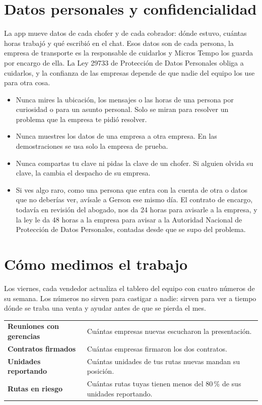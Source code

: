 \documentclass[a4paper]{article}
\begin{document}
\section{Datos personales y confidencialidad}

La app mueve datos de cada chofer y de cada cobrador: dónde estuvo, cuántas horas trabajó y qué escribió en el chat. Esos datos son de cada persona, la empresa de transporte es la responsable de cuidarlos y Micros Tempo los guarda por encargo de ella. La Ley 29733 de Protección de Datos Personales obliga a cuidarlos, y la confianza de las empresas depende de que nadie del equipo los use para otra cosa.

\begin{itemize}
\item Nunca mires la ubicación, los mensajes o las horas de una persona por curiosidad o para un asunto personal. Solo se miran para resolver un problema que la empresa te pidió resolver.
\item Nunca muestres los datos de una empresa a otra empresa. En las demostraciones se usa solo la empresa de prueba.
\item Nunca compartas tu clave ni pidas la clave de un chofer. Si alguien olvida su clave, la cambia el despacho de su empresa.
\item Si ves algo raro, como una persona que entra con la cuenta de otra o datos que no deberías ver, avísale a Gerson ese mismo día. El contrato de encargo, todavía en revisión del abogado, nos da 24 horas para avisarle a la empresa, y la ley le da 48 horas a la empresa para avisar a la Autoridad Nacional de Protección de Datos Personales, contadas desde que se supo del problema.
\end{itemize}

\section{Cómo medimos el trabajo}

Los viernes, cada vendedor actualiza el tablero del equipo con cuatro números de su semana. Los números no sirven para castigar a nadie: sirven para ver a tiempo dónde se traba una venta y ayudar antes de que se pierda el mes.

\begin{center}
\begin{tabularx}{\linewidth}{@{}>{\bfseries}p{4.4cm}X@{}}
\toprule
Reuniones con gerencias & Cuántas empresas nuevas escucharon la presentación.\\
Contratos firmados & Cuántas empresas firmaron los dos contratos.\\
Unidades reportando & Cuántas unidades de tus rutas nuevas mandan su posición.\\
Rutas en riesgo & Cuántas rutas tuyas tienen menos del 80\,\% de sus unidades reportando.\\
\bottomrule
\end{tabularx}
\end{center}
\end{document}
